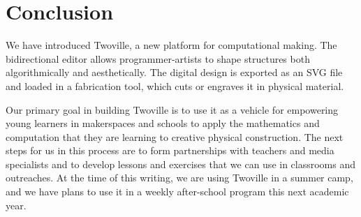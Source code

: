 \section{Conclusion}

We have introduced Twoville, a new platform for computational making. The bidirectional editor allows programmer-artists to shape structures both algorithmically and aesthetically. The digital design is exported as an SVG file and loaded in a fabrication tool, which cuts or engraves it in physical material.

Our primary goal in building Twoville is to use it as a vehicle for empowering young learners in makerspaces and schools to apply the mathematics and computation that they are learning to creative physical construction. The next steps for us in this process are to form partnerships with teachers and media specialists and to develop lessons and exercises that we can use in classrooms and outreaches. At the time of this writing, we are using Twoville in a summer camp, and we have plans to use it in a weekly after-school program this next academic year.
